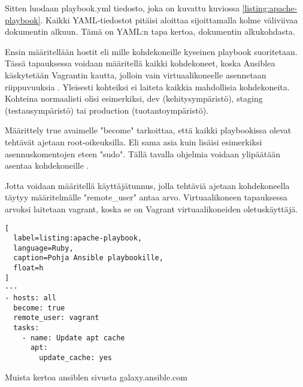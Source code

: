 Sitten luodaan playbook.yml tiedosto, joka on kuvattu kuviossa \ref{listing:apache-playbook}. Kaikki YAML-tiedostot pitäisi aloittaa sijoittamalla kolme väliviivaa dokumentin alkuun. Tämä on YAML:n tapa kertoa, dokumentin alkukohdasta.

Ensin määritellään hostit eli mille kohdekoneille kyseinen playbook suoritetaan. Tässä tapauksessa voidaan määritellä kaikki kohdekoneet, koska Ansiblea käskytetään Vagrantin kautta, jolloin vain virtuaalikoneelle asennetaan riippuvuuksia \cite{link:comprehensive-ansible-tutorial}. Yleisesti kohteiksi ei laiteta kaikkia mahdollisia kohdekoneita. Kohteina normaalisti olisi esimerkiksi, dev (kehitysympäristö), staging (testausympäristö) tai production (tuotantoympäristö).

Määrittely true avaimelle "become" tarkoittaa, että kaikki playbookissa olevat tehtävät ajetaan root-oikeuksilla. Eli sama asia kuin lisäisi esimerkiksi asennuskomentojen eteen "sudo". Tällä tavalla ohjelmia voidaan ylipäätään asentaa kohdekoneille \cite{link:ansible-configuration-file}.

Jotta voidaan määritellä käyttäjätunnus, jolla tehtäviä ajetaan kohdekoneella täytyy määritelmälle "remote\_user" antaa arvo. Virtuaalikoneen tapauksessa arvoksi laitetaan vagrant, koska se on Vagrant virtuaalikoneiden oletuskäyttäjä.

\begin{lstlisting}[
  label=listing:apache-playbook,
  language=Ruby,
  caption=Pohja Ansible playbookille,
  float=h
]
---
- hosts: all
  become: true
  remote_user: vagrant
  tasks:
    - name: Update apt cache
      apt:
        update_cache: yes
\end{lstlisting}


Muista kertoa ansiblen sivusta galaxy.ansible.com
